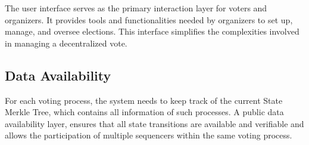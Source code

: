 The user interface serves as the primary interaction layer for voters and organizers. It provides tools and functionalities needed by organizers to set up, manage, and oversee elections. This interface simplifies the complexities involved in managing a decentralized vote.

\subsection{Data Availability}

For each voting process, the system needs to keep track of the current State Merkle Tree, which contains all information of such processes. A public data availability layer, ensures that all state transitions are available and verifiable and allows the participation of multiple sequencers within the same voting process.